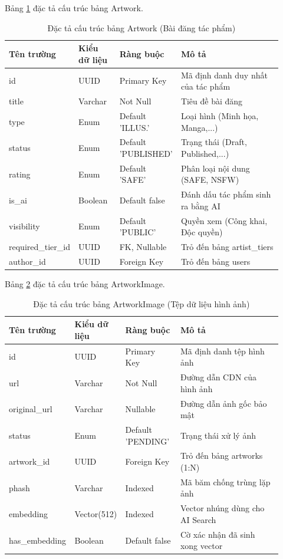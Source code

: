 Bảng \ref{table:4_2} đặc tả cấu trúc bảng Artwork.
\begin{table}[h!]
    \caption{Đặc tả cấu trúc bảng Artwork (Bài đăng tác phẩm)}
    \label{table:4_2}
\centering
\small
\renewcommand{\arraystretch}{1.2}
\begin{tabular}{|p{0.2\linewidth}|p{0.15\linewidth}|p{0.2\linewidth}|p{0.37\linewidth}|}
\hline
\textbf{Tên trường} & \textbf{Kiểu dữ liệu} & \textbf{Ràng buộc} & \textbf{Mô tả} \\ \hline
id & UUID & Primary Key & Mã định danh duy nhất của tác phẩm \\ \hline
title & Varchar & Not Null & Tiêu đề bài đăng \\ \hline
type & Enum & Default 'ILLUS.' & Loại hình (Minh họa, Manga,...) \\ \hline
status & Enum & Default 'PUBLISHED' & Trạng thái (Draft, Published,...) \\ \hline
rating & Enum & Default 'SAFE' & Phân loại nội dung (SAFE, NSFW) \\ \hline
is\_ai & Boolean & Default false & Đánh dấu tác phẩm sinh ra bằng AI \\ \hline
visibility & Enum & Default 'PUBLIC' & Quyền xem (Công khai, Độc quyền) \\ \hline
required\_tier\_id & UUID & FK, Nullable & Trỏ đến bảng artist\_tiers \\ \hline
author\_id & UUID & Foreign Key & Trỏ đến bảng users \\ \hline
\end{tabular}
\end{table}
\FloatBarrier

Bảng \ref{table:4_3} đặc tả cấu trúc bảng ArtworkImage.
\begin{table}[h!]
    \caption{Đặc tả cấu trúc bảng ArtworkImage (Tệp dữ liệu hình ảnh)}
    \label{table:4_3}
\centering
\small
\renewcommand{\arraystretch}{1.2}
\begin{tabular}{|p{0.2\linewidth}|p{0.15\linewidth}|p{0.2\linewidth}|p{0.37\linewidth}|}
\hline
\textbf{Tên trường} & \textbf{Kiểu dữ liệu} & \textbf{Ràng buộc} & \textbf{Mô tả} \\ \hline
id & UUID & Primary Key & Mã định danh tệp hình ảnh \\ \hline
url & Varchar & Not Null & Đường dẫn CDN của hình ảnh \\ \hline
original\_url & Varchar & Nullable & Đường dẫn ảnh gốc bảo mật \\ \hline
status & Enum & Default 'PENDING' & Trạng thái xử lý ảnh \\ \hline
artwork\_id & UUID & Foreign Key & Trỏ đến bảng artworks (1:N) \\ \hline
phash & Varchar & Indexed & Mã băm chống trùng lặp ảnh \\ \hline
embedding & Vector(512) & Indexed & Vector nhúng dùng cho AI Search \\ \hline
has\_embedding & Boolean & Default false & Cờ xác nhận đã sinh xong vector \\ \hline
\end{tabular}
\end{table}
\FloatBarrier

